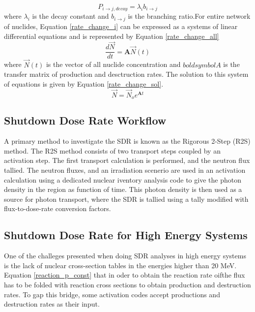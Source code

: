 \begin{equation}\label{decay_p_const}
  P_{i \rightarrow j, decay} = \lambda_{i} b_{i \rightarrow j}
\end{equation}
where $\lambda_{i}$ is the decay constant and $b_{i \rightarrow j}$ is
the branching ratio.For entire network of nuclides,
Equation \ref{rate_change_i} can be expressed as
a systems of linear differential equations and is represented by Equation
\ref{rate_change_all}
\begin{equation}\label{rate_change_all}
  \frac{d\vec{N}}{dt} =\boldsymbol{A}  \vec{N}(t)
\end{equation}
where $\vec{N}(t)$ is the vector of all nuclide concentration and $boldsymbol{A}$
is the transfer matrix of production and desctruction rates. The solution to this
system of equations is given by Equation \ref{rate_change_sol}.
\begin{equation}\label{rate_change_sol}
  \vec{N} =\vec{N}_{o} e^{\boldsymbol{A}t}
\end{equation}


\subsection{Shutdown Dose Rate Workflow}

A primary method to investigate the SDR is known as the
Rigorous 2-Step (R2S) method. The R2S method consists of two transport steps
coupled by an activation step. 
The first transport calculation is performed, and the neutron flux tallied.
The neutron fluxes, and an irradiation scenerio are used in an activation
calculation using a dedicated nuclear iventory analysis code to give the 
photon density in the region as function of time. 
This photon density is then used as a source for photon transport,
where the SDR is tallied using a tally modified with flux-to-dose-rate
conversion factors.

\subsection{Shutdown Dose Rate for High Energy Systems}
One of the challeges presented when doing SDR analyses in high energy systems is the 
lack of nuclear cross-section tables in the energies higher than 20 MeV. 
Equation \ref{reaction_p_const} that in oder to obtain the reaction rate oifthe flux has to be folded 
with reaction cross sections to obtain production and destruction rates.
To gap this bridge, some activation codes accept productions and destruction rates
as their input.




